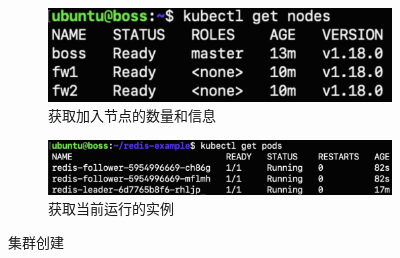 \documentclass{article}
\begin{document}
\begin{figure}[H]
    \begin{subfigure}[b]{0.3\textwidth}
        \centering
        \includegraphics[width=\textwidth]{nodes.png}
        \caption{获取加入节点的数量和信息}
        \label{fig:nodes1}
    \end{subfigure}
    \hfill
    \begin{subfigure}[b]{0.65\textwidth}
        \centering
        \includegraphics[width=\textwidth]{pods.png}
        \caption{获取当前运行的实例}
        \label{fig:pods1}
    \end{subfigure}
    \caption{集群创建}
\end{figure}
\end{document}
